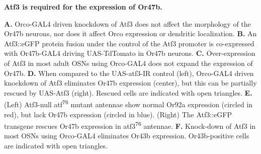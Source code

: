 {\bf Atf3 is required for the expression of Or47b.}

\textbf{A.} Orco-GAL4 driven knockdown of Atf3 does not affect the morphology of the Or47b neurons, nor does it affect Orco expression or dendritic localization.
\textbf{B.} An Atf3::eGFP protein fusion under the control of the Atf3 promoter is co-expressed with Or47b-GAL4 driving UAS-TdTomato in Or47b neurons.
\textbf{C.} Over-expression of Atf3 in most adult OSNs using Orco-GAL4 does not expand the expression of Or47b.
\textbf{D.} When compared to the UAS-atf3-IR control (left), Orco-GAL4 driven knockdown of Atf3 eliminates Or47b expression (center), but this can be partially rescued by UAS-Atf3 (right). Rescued cells are indicated with open triangles.
\textbf{E.} (Left) Atf3-null atf\textsuperscript{76} mutant antennae show normal Or92a expression (circled in red), but lack Or47b expression (circled in blue). (Right) The Atf3::eGFP transgene rescues Or47b expression in atf3\textsuperscript{76} antennae.
\textbf{F.} Knock-down of Atf3 in most OSNs using Orco-GAL4 eliminates Or43b expression. Or43b-positive cells are indicated with open triangles.
\label{fig:3}
